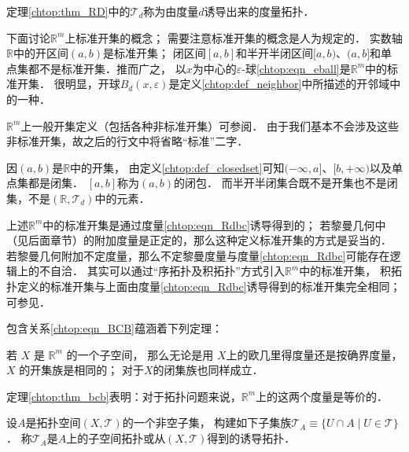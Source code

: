 定理\ref{chtop:thm_RD}中的$\mathscr{T}_d$称为由度量$d$诱导出来的{\heiti 度量拓扑}．



下面讨论$\mathbb{R}^m$上{\heiti 标准开集}的概念；
需要注意{\kaishu 标准开集}的概念是人为规定的．
实数轴$\mathbb{R}$中的开区间$(a,b)$是{\kaishu 标准开集}；
闭区间$[a,b]$和半开半闭区间$[a,b)$、$(a,b]$和单点集都不是标准开集．推而广之，
以$x$为中心的$\varepsilon$-球\eqref{chtop:eqn_eball}是$\mathbb{R}^m$中的{\kaishu 标准开集}．
很明显，开球$B_{d}(x,\varepsilon)$是定义\ref{chtop:def_neighbor}中所描述的{\kaishu 开邻域}中的一种．

$\mathbb{R}^m$上一般开集定义（包括各种非标准开集）可参阅\parencite[\S 12,\S 13]{munkres-2000-topology}．
由于我们基本不会涉及这些非标准开集，故之后的行文中将省略“标准”二字．

\begin{example}
	因$(a,b)$是$\mathbb{R}$中的开集，
	由定义\ref{chtop:def_closedset}可知$(-\infty, a]$、$[b,+\infty)$以及单点集都是闭集．
	$[a,b]$称为$(a,b)$的{\kaishu 闭包}．
	而半开半闭集合既不是开集也不是闭集，不是$(\mathbb{R},\mathscr{T}_d)$中的元素．
\end{example}



\begin{remark}
	上述$\mathbb{R}^m$中的标准开集是通过度量\eqref{chtop:eqn_Rdbc}诱导得到的；
	若黎曼几何中（见后面章节）的附加度量是正定的，那么这种定义标准开集的方式是妥当的．
	若黎曼几何附加不定度量，那么不定黎曼度量与度量\eqref{chtop:eqn_Rdbc}可能存在逻辑上的不自洽．
	其实可以通过“序拓扑及积拓扑”方式引入$\mathbb{R}^m$中的标准开集，
	积拓扑定义的标准开集与上面由度量\eqref{chtop:eqn_Rdbc}诱导得到的标准开集完全相同；
	可参见\parencite{munkres-2000-topology}．
\end{remark}



包含关系\eqref{chtop:eqn_BCB}蕴涵着下列定理：
\begin{theorem}\label{chtop:thm_bcb}
    若 $X$ 是 $\mathbb{R}^m$ 的一个子空间，
    那么无论是用 $X$上的欧几里得度量还是按确界度量，
    $X$ 的开集族是相同的； 对于$X$的闭集族也同样成立．    
\end{theorem}

定理\ref{chtop:thm_bcb}表明：对于拓扑问题来说，$\mathbb{R}^m$上的这两个度量是等价的．




\begin{definition}\label{chtop:def_induced-top}
    设$A$是拓扑空间$(X,\mathscr{T})$的一个非空子集，
    构建如下子集族$\mathscr{T} _A \equiv \{U\cap A \mid U\in \mathscr{T}\}$．
    称$\mathscr{T}_A$是$A$上的{\heiti 子空间拓扑}或从$(X,\mathscr{T})$得到的{\heiti 诱导拓扑}．
\end{definition}

